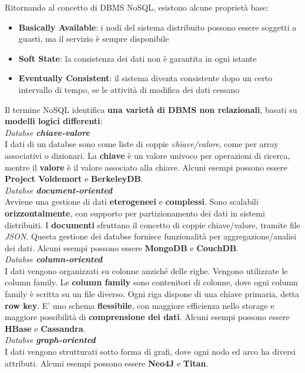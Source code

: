 \documentclass{article}
\begin{document}
Ritornando al concetto di DBMS NoSQL, esistono alcune proprietà base:
\begin{itemize}[label={-}, leftmargin=1cm]
    \item \textbf{Basically Available}: i nodi del sistema distribuito possono essere soggetti a guasti, ma il servizio è sempre disponibile
    \item \textbf{Soft State}: la consistenza dei dati non è garantita in ogni istante
    \item \textbf{Eventually Consistent}: il sistema diventa consistente dopo un certo intervallo di tempo, se le attività di modifica dei dati cessano\\
\end{itemize}
Il termine NoSQL identifica \textbf{una varietà di DBMS non relazionali}, basati su \textbf{modelli logici differenti}:\vspace{14pt}\\
\textit{Databse \textbf{chiave-valore}}\\
I dati di un databse sono come liste di coppie \textit{chiave/valore}, come per array associativi o dizionari. La \textbf{chiave} è un valore univoco per operazioni di ricerca, mentre il \textbf{valore} è il valore associato alla chiave. Alcuni esempi possono essere \textbf{Project Voldemort} e \textbf{BerkeleyDB}.\vspace{14pt}\\
\textit{Databse \textbf{document-oriented}}\\
Avviene una gestione di dati \textbf{eterogeneei} e \textbf{complessi}. Sono scalabili \textbf{orizzontalmente}, con supporto per partizionamento dei dati in sistemi distribuiti. I \textbf{documenti} sfruttano il concetto di coppie chiave/valore, tramite file \textit{JSON}. Questa gestione dei databse fornisce funzionalità per aggregazione/analisi dei dati. Alcuni esempi possono essere \textbf{MongoDB} e \textbf{CouchDB}.\vspace{14pt}\\
\textit{Databse \textbf{column-oriented}}\\
I dati vengono organizzati su colonne anziché delle righe. Vengono utilizzate le column family. Le \textbf{column family} sono contenitori di colonne, dove ogni column family è scritta su un file diverso. Ogni riga dispone di una chiave primaria, detta \textbf{row key}. E' uno schema \textbf{flessibile}, con maggiore efficienza nello storage e maggiore possibilità di \textbf{comprensione dei dati}. Alcuni esempi possono essere \textbf{HBase} e \textbf{Cassandra}.\vspace{14pt}\\
\textit{Databse \textbf{graph-oriented}}\\
I dati vengono strutturati sotto forma di grafi, dove ogni nodo ed arco ha diversi attributi. Alcuni esempi possono essere \textbf{Neo4J} e \textbf{Titan}.
\end{document}

